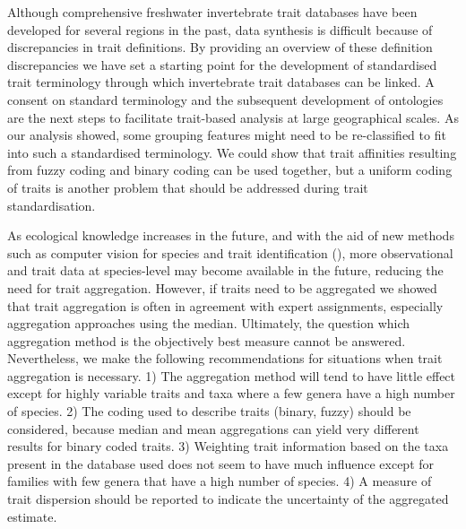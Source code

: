 \documentclass{article}
\begin{document}
Although comprehensive freshwater invertebrate trait databases have been developed for several regions in the past, data synthesis is difficult because of discrepancies in trait definitions. By providing an overview of these definition discrepancies we have set a starting point for the development of standardised trait terminology through which invertebrate trait databases can be linked. A consent on standard terminology and the subsequent development of ontologies are the next steps to facilitate trait-based analysis at large geographical scales. As our analysis showed, some grouping features might need to be re-classified to fit into such a standardised terminology. We could show that trait affinities resulting from fuzzy coding and binary coding can be used together, but a uniform coding of traits is another problem that should be addressed during trait standardisation. 

As ecological knowledge increases in the future, and with the aid of new  methods such as computer vision for species and trait identification (\cite{hoye_deep_2020}), more observational and trait data at species-level may become available in the future, reducing the need for trait aggregation. However, if traits need to be aggregated we showed that trait aggregation is often in agreement with expert assignments, especially aggregation approaches using the median. Ultimately, the question which aggregation method is the objectively best measure cannot be answered. Nevertheless, we make the following recommendations for situations when trait aggregation is necessary. 1) The aggregation method will tend to have little effect except for highly variable traits and taxa where a few genera have a high number of species. 2) The coding used to describe traits (binary, fuzzy) should be considered, because median and mean aggregations can yield very different results for binary coded traits. 3) Weighting trait information based on the taxa present in the database used does not seem to have much influence except for families with few genera that have a high number of species. 4) A measure of trait dispersion should be reported to indicate the uncertainty of the aggregated estimate. 
\end{document}
